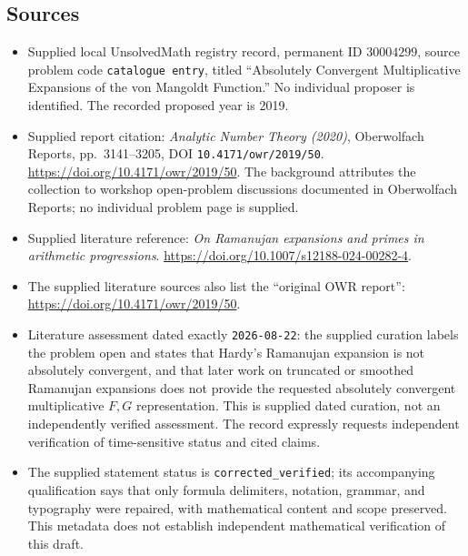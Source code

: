 \documentclass[11pt]{article}
\begin{document}
\subsection{Sources}
\begin{itemize}
\item Supplied local UnsolvedMath registry record, permanent ID \(30004299\), source problem code \texttt{catalogue entry}, titled ``Absolutely Convergent Multiplicative Expansions of the von Mangoldt Function.'' No individual proposer is identified. The recorded proposed year is 2019.
\item Supplied report citation: \emph{Analytic Number Theory (2020)}, Oberwolfach Reports, pp.~3141--3205, DOI \texttt{10.4171/owr/2019/50}. \url{https://doi.org/10.4171/owr/2019/50}. The background attributes the collection to workshop open-problem discussions documented in Oberwolfach Reports; no individual problem page is supplied.
\item Supplied literature reference: \emph{On Ramanujan expansions and primes in arithmetic progressions}. \url{https://doi.org/10.1007/s12188-024-00282-4}.
\item The supplied literature sources also list the ``original OWR report'': \url{https://doi.org/10.4171/owr/2019/50}.
\item Literature assessment dated exactly \texttt{2026-08-22}: the supplied curation labels the problem open and states that Hardy's Ramanujan expansion is not absolutely convergent, and that later work on truncated or smoothed Ramanujan expansions does not provide the requested absolutely convergent multiplicative \(F,G\) representation. This is supplied dated curation, not an independently verified assessment. The record expressly requests independent verification of time-sensitive status and cited claims.
\item The supplied statement status is \texttt{corrected\_verified}; its accompanying qualification says that only formula delimiters, notation, grammar, and typography were repaired, with mathematical content and scope preserved. This metadata does not establish independent mathematical verification of this draft.
\end{itemize}
\end{document}
